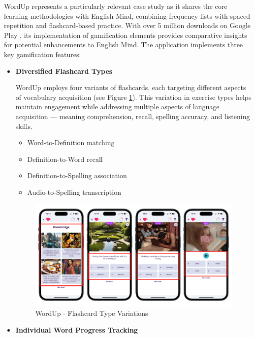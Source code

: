 WordUp represents a particularly relevant case study as it shares the core learning methodologies with English Mind, combining frequency lists with spaced repetition and flashcard-based practice. With over 5 million downloads on Google Play \cite{cite:wordup_google_play}, its implementation of gamification elements provides comparative insights for potential enhancements to English Mind. The application implements three key gamification features:

\begin{itemize}
    \item \textbf{Diversified Flashcard Types}

    WordUp employs four variants of flashcards, each targeting different aspects of vocabulary acquisition (see Figure \ref{fig:wordup-flashcard-types}). This variation in exercise types helps maintain engagement while addressing multiple aspects of language acquisition — meaning comprehension, recall, spelling accuracy, and listening skills.
    
    \begin{itemize}
        \item Word-to-Definition matching
        \item Definition-to-Word recall
        \item Definition-to-Spelling association
        \item Audio-to-Spelling transcription
    \end{itemize}

    \begin{figure}[!h]
        \includegraphics[width=1\textwidth]{src/figures/wordup-flashcard-types.png}
        \caption{WordUp - Flashcard Type Variations}
        \label{fig:wordup-flashcard-types}
    \end{figure}
    
    \item \textbf{Individual Word Progress Tracking}
    \label{sec:wordup-individual-word-progress-experience}
    

\end{itemize}
